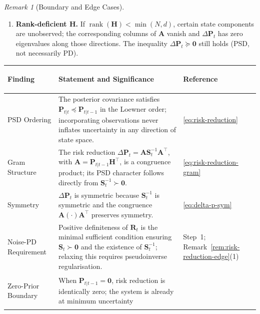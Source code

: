 \documentclass[12pt,openany]{book}
\numberwithin{equation}{chapter}
\theoremstyle{plain}
\theoremstyle{definition}
\theoremstyle{remark}
\newtheorem{remark}[theorem]{Remark}
\renewcommand{\arraystretch}{1.2}
\begin{document}
\begin{remark}[Boundary and Edge Cases]
\begin{enumerate}
  \item \textbf{Rank-deficient $\mathbf{H}$.}
        If $\operatorname{rank}(\mathbf{H}) < \min(N, d)$, certain
        state components are unobserved; the corresponding columns
        of $\mathbf{A}$ vanish and $\Delta\mathbf{P}_t$ has zero
        eigenvalues along those directions.
        The inequality $\Delta\mathbf{P}_t \succeq \mathbf{0}$
        still holds (PSD, not necessarily PD).
\end{enumerate}
\end{remark}

\begin{center}
\renewcommand{\arraystretch}{1.35}
\begin{tabularx}{\linewidth}{|>{\bfseries\raggedright\arraybackslash}p{3.2cm}
                              |>{\raggedright\arraybackslash}X
                              |>{\centering\arraybackslash}p{2.8cm}|}
\hline
\rowcolor{gray!18}
\textbf{Finding} & \textbf{Statement and Significance} &
\textbf{Reference} \\
\hline
PSD Ordering &
  The posterior covariance satisfies
  $\mathbf{P}_{t|t} \preceq \mathbf{P}_{t|t-1}$ in the Loewner
  order; incorporating observations never inflates uncertainty in
  any direction of state space. &
  \eqref{eq:risk-reduction} \\
\hline
Gram Structure &
  The risk reduction
  $\Delta\mathbf{P}_t =
  \mathbf{A}\mathbf{S}_t^{-1}\mathbf{A}^\top$,
  with $\mathbf{A} = \mathbf{P}_{t|t-1}\mathbf{H}^\top$,
  is a congruence product; its PSD character follows directly from
  $\mathbf{S}_t^{-1} \succ \mathbf{0}$. &
  \eqref{eq:risk-reduction-gram} \\
\hline
Symmetry &
  $\Delta\mathbf{P}_t$ is symmetric because $\mathbf{S}_t^{-1}$
  is symmetric and the congruence
  $\mathbf{A}(\cdot)\mathbf{A}^\top$ preserves symmetry. &
  \eqref{eq:delta-p-sym} \\
\hline
Noise-PD Requirement &
  Positive definiteness of $\mathbf{R}_t$ is the minimal
  sufficient condition ensuring $\mathbf{S}_t \succ \mathbf{0}$
  and the existence of $\mathbf{S}_t^{-1}$; relaxing this
  requires pseudoinverse regularisation. &
  Step~1; Remark~\ref{rem:risk-reduction-edge}(1) \\
\hline
Zero-Prior Boundary &
  When $\mathbf{P}_{t|t-1} = \mathbf{0}$, risk reduction is
  identically zero; the system is already at minimum uncertainty

\end{tabularx}
\end{center}
\end{document}
